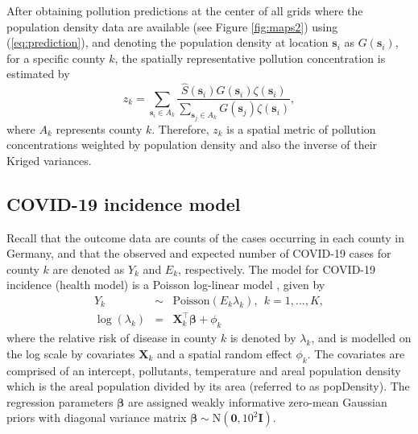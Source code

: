\documentclass[12,]{article}
\begin{document}
After obtaining pollution predictions at the center of all grids where
the population density data are available (see Figure \ref{fig:maps2})
using (\ref{eq:prediction}), and denoting the population density at
location \(\symbf{s}_i\) as \(G(\symbf{s}_i)\), for a specific county
\(k\), the spatially representative pollution concentration is estimated
by \begin{equation}
z_k = \sum_{\symbf{s}_i \in A_k}\frac{\hat{S}(\symbf{s}_i)G(\symbf{s}_i)\zeta(\symbf{s}_i)}{\sum_{\symbf{s}_j \in A_k} G(\symbf{s}_j)\zeta(\symbf{s}_i)},
\label{eq:arealEstimate}
\end{equation} where \(A_k\) represents county \(k\). Therefore, \(z_k\)
is a spatial metric of pollution concentrations weighted by population
density and also the inverse of their Kriged variances.

\hypertarget{sec:healthModel}{%
\subsection{COVID-19 incidence model}\label{sec:healthModel}}

Recall that the outcome data are counts of the cases occurring in each
county in Germany, and that the observed and expected number of COVID-19
cases for county \(k\) are denoted as \(Y_{k}\) and \(E_{k}\),
respectively. The model for COVID-19 incidence (health model) is a
Poisson log-linear model \autocite[see][]{Shaddick2015}, given by
\begin{eqnarray}\label{eq:healthmodel}
Y_{k}  &\sim & \mbox{Poisson}(E_{k}\lambda_{k}),~~k=1,\ldots,K,\\\nonumber
\log(\lambda_{k}) &=& \symbf{X}_{k}^{\top}\symbf{\beta}+\phi_{k}
\end{eqnarray} where the relative risk of disease in county \(k\) is
denoted by \(\lambda_{k}\), and is modelled on the log scale by
covariates \(\symbf{X}_{k}\) and a spatial random effect \(\phi_{k}\).
The covariates are comprised of an intercept, pollutants, temperature
and areal population density which is the areal population divided by
its area (referred to as popDensity). The regression parameters
\(\symbf{\beta}\) are assigned weakly informative zero-mean Gaussian
priors with diagonal variance matrix
\(\symbf{\beta}\sim \mbox{N}\left(\symbf{0},10^2\symbf{I} \right)\).
\end{document}
